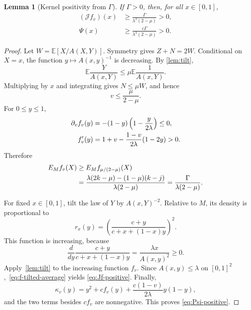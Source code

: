 \documentclass[11pt,a4paper]{article}
\numberwithin{equation}{section}
\theoremstyle{plain}
\newtheorem{lemma}[lemma]{Lemma}
\theoremstyle{definition}
\theoremstyle{remark}
\newcommand{\E}{\mathbb E}
\newcommand{\J}{\mathcal J}
\begin{document}
\begin{lemma}[Kernel positivity from $\Gamma$]\label{lem:kernel}
If $\Gamma>0$, then, for all $x\in[0,1]$,
\begin{align}\label{eq:Jf-positive}
 (\J f_v)(x)&\ge\frac{\Gamma}{\lambda^3(2-\mu)}>0,\\
 \Psi(x)&\ge\frac{c\Gamma}{\lambda^3(2-\mu)}>0.
 \label{eq:Psi-positive}
\end{align}
\end{lemma}
\begin{proof}
Let $W=\E[X/A(X,Y)]$.  Symmetry gives $Z+N=2W$.  Conditional on $X=x$,
the function $y\mapsto A(x,y)^{-1}$ is decreasing.  By
\cref{lem:tilt},
\begin{equation}
 \E\frac{Y}{A(x,Y)}\le\mu\E\frac1{A(x,Y)}.
\end{equation}
Multiplying by $x$ and integrating gives $N\le\mu W$, and hence
\begin{equation}\label{eq:v-mu}
 v\le\frac{\mu}{2-\mu}.
\end{equation}
For $0\le y\le1$,
\begin{align}\label{eq:f-monotone}
 \partial_v f_v(y)&=-(1-y)\left(1-\frac{y}{2\lambda}\right)\le0,\notag\\
 f_v'(y)&=1+v-\frac{1-v}{2\lambda}(1-2y)>0.
\end{align}
Therefore
\begin{align}\label{eq:f-tilted-average}
 E_M f_v(X)
 &\ge E_M f_{\mu/(2-\mu)}(X)\notag\\
 &=\frac{\lambda(2k-\mu)-(1-\mu)(k-j)}{\lambda(2-\mu)}
 =\frac{\Gamma}{\lambda(2-\mu)}.
\end{align}

For fixed $x\in[0,1]$, tilt the law of $Y$ by $A(x,Y)^{-2}$.  Relative
to $M$, its density is proportional to
\begin{equation}
 r_x(y)=\left(\frac{c+y}{c+x+(1-x)y}\right)^2.
\end{equation}
This function is increasing, because
\begin{equation}\label{eq:likelihood-deriv}
 \frac{d}{dy}\frac{c+y}{c+x+(1-x)y}
 =\frac{\lambda x}{A(x,y)^2}\ge0.
\end{equation}
Apply~\cref{lem:tilt} to the increasing function $f_v$.  Since
$A(x,y)\le\lambda$ on $[0,1]^2$,~\eqref{eq:f-tilted-average} yields
\eqref{eq:Jf-positive}.  Finally,
\begin{equation}
 \kappa_v(y)=y^2+c f_v(y)+\frac{c(1-v)}{2\lambda}y(1-y),
\end{equation}
and the two terms besides $c f_v$ are nonnegative.  This proves
\eqref{eq:Psi-positive}.
\end{proof}
\end{document}
